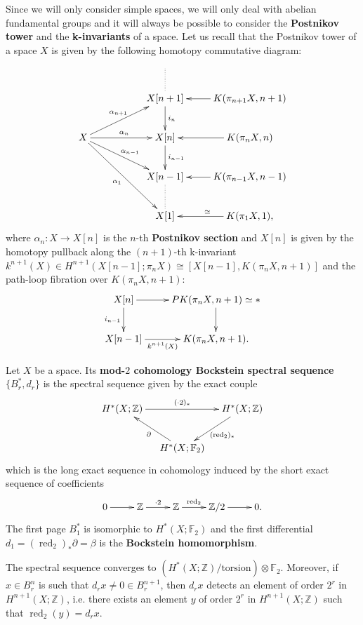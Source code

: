 \documentclass{amsart}
\theoremstyle{definition}
\theoremstyle{remark}
\DeclareMathOperator{\red}{red}
\newcommand{\Z}{\mathbb{Z}}
\newcommand{\F}{\mathbb{F}}
\begin{document}
Since we will only consider simple spaces, we will only deal with abelian fundamental groups and it will always be possible to consider the {\bf Postnikov tower} and the {\bf k-invariants} of a space.  Let us recall that the Postnikov tower of a space $X$ is given by the following homotopy commutative diagram:
$$\xymatrix{
&&\\
&&X[n+1] \ar@{.}[u] \ar[d]^{i_n} &K(\pi_{n+1}X,n+1) \ar[l] \\
X\ar[rru]^{\alpha_{n+1}}
\ar[rr]^{\alpha_n}
\ar[rrd]^{\alpha_{n-1}}
\ar[rrdd]_{\alpha_1}
&&X[n] \ar[d]^{i_{n-1}} &K(\pi_{n}X,n) \ar[l] \\
&&X[n-1] \ar@{.}[d] &K(\pi_{n-1}X,n-1) \ar[l] \\
&&X[1] &K(\pi_1 X,1), \ar[l]_\simeq
}$$ where $\alpha_n:X\to X[n]$ is the $n$-th {\bf Postnikov section} and $X[n]$ is given by the homotopy pullback along the $(n+1)$-th k-invariant $k^{n+1}(X)\in H^{n+1}(X[n-1];\pi_n X)\cong[X[n-1],K(\pi_n X,n+1)]$ and the path-loop fibration over $K(\pi_n X,n+1)$:
$$\xymatrix{
X[n]\ar[r]\ar[d]_{i_{n-1}} &PK(\pi_n X,n+1)\simeq{*}\ar[d]\\
X[n-1]\ar[r]_-{k^{n+1}(X)} &K(\pi_n X,n+1).
}$$

Let $X$ be a space. Its {\bf mod-$2$ cohomology Bockstein spectral sequence} $\{B^*_r,d_r\}$ is the spectral sequence given by the exact couple 
$$\xymatrix@C=0.4truecm{
H^*(X;\Z)\ar[rr]^-{(\cdot2)_*} &&H^*(X;\Z)\ar[ld]^{(\red_2)_*}\\
&H^*(X;\F_2)\ar[lu]^{\partial}
}$$
which is the long exact sequence in cohomology induced by the short exact sequence of coefficients
$$\xymatrix{
0\ar[r] &\Z\ar[r]^-{\cdot2} &\Z\ar[r]^-{\red_2} &\Z/2\ar[r] &0.
}$$
The first page $B_1^*$ is isomorphic to $H^*(X;\F_2)$ and the first differential $d_1=(\red_2)_*\partial=\beta$ is the {\bf Bockstein homomorphism}. 

The spectral sequence converges to $(H^*(X;\Z)/\text{torsion})\otimes\F_2$. Moreover, if $x\in B_r^{n}$ is such that $d_r x\not=0\in B_r^{n+1}$, then $d_r x$ detects an element of order $2^r$ in $H^{n+1}(X;\Z)$, i.e. there exists an element $y$ of order $2^r$ in $H^{n+1}(X;\Z)$ such that $\red_2(y)=d_rx$. 
\end{document}
